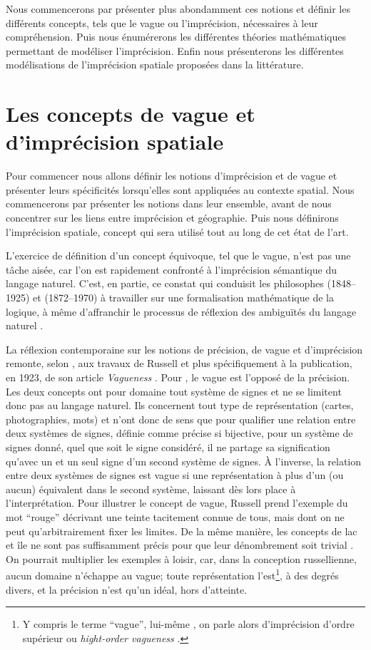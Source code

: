 Nous commencerons par présenter plus abondamment ces notions et
définir les différents concepts, tels que le vague ou l’imprécision,
nécessaires à leur compréhension. Puis nous énumérerons les
différentes théories mathématiques permettant de modéliser
l’imprécision. Enfin nous présenterons les différentes modélisations
de l’imprécision spatiale proposées dans la littérature.

\section{Les concepts de vague et d’imprécision spatiale}

Pour commencer nous allons définir les notions d’imprécision et de
vague et présenter leurs spécificités lorsqu’elles sont appliquées au
contexte spatial. Nous commencerons par présenter les notions dans
leur ensemble, avant de nous concentrer sur les liens entre
imprécision et géographie. Puis nous définirons l’imprécision
spatiale, concept qui sera utilisé tout au long de cet état de l’art.

L’exercice de définition d’un concept équivoque, tel que le vague,
n’est pas une tâche aisée, car l’on est rapidement confronté à
l’imprécision sémantique du langage naturel. C’est, en partie, ce
constat qui conduisit les philosophes  (1848–1925) et
 (1872–1970) à travailler sur une formalisation
mathématique de la logique, à même d’affranchir le processus de
réflexion des ambiguïtés du langage naturel \autocite{Williamson1994}.

La réflexion contemporaine sur les notions de précision, de vague et
d’imprécision remonte, selon \textcite{Williamson1994}, aux travaux de
Russell et plus spécifiquement à la publication, en 1923, de son
article \emph{Vagueness} \autocite{Russell1923}. Pour ,
le vague est l’opposé de la précision. Les deux concepts ont pour
domaine tout système de signes et ne se limitent donc pas au langage
naturel. Ils concernent tout type de représentation (\eg cartes,
photographies, mots) et n’ont donc de sens que pour qualifier une
relation entre deux systèmes de signes, définie comme précise si
bijective, \ie pour un système de signes donné, quel que soit le signe
considéré, il ne partage sa signification qu’avec un et un seul signe
d’un second système de signes. À l’inverse, la relation entre deux
systèmes de signes est vague si une représentation à plus d’un (ou
aucun) équivalent dans le second système, laissant dès lors place à
l’interprétation. Pour illustrer le concept de vague, Russell prend
l’exemple du mot \enquote{rouge} décrivant une teinte tacitement
connue de tous, mais dont on ne peut qu’arbitrairement fixer les
limites. De la même manière, les concepts de lac et île ne sont pas
suffisamment précis pour que leur dénombrement soit trivial
\autocite{Sarjakoski1996}. On pourrait multiplier les exemples à
loisir, car, dans la conception russellienne, aucun domaine n’échappe
au vague; toute représentation l’est\footnote{Y compris le terme
  \enquote{vague}, lui-même \autocite{Russell1923}, on parle alors
  d’imprécision d’ordre supérieur ou \emph{hight-order vagueness}
  \autocite{Williamson1994, Varzi2003}.}, à des degrés divers, et la
précision n’est qu’un idéal, hors d’atteinte.

